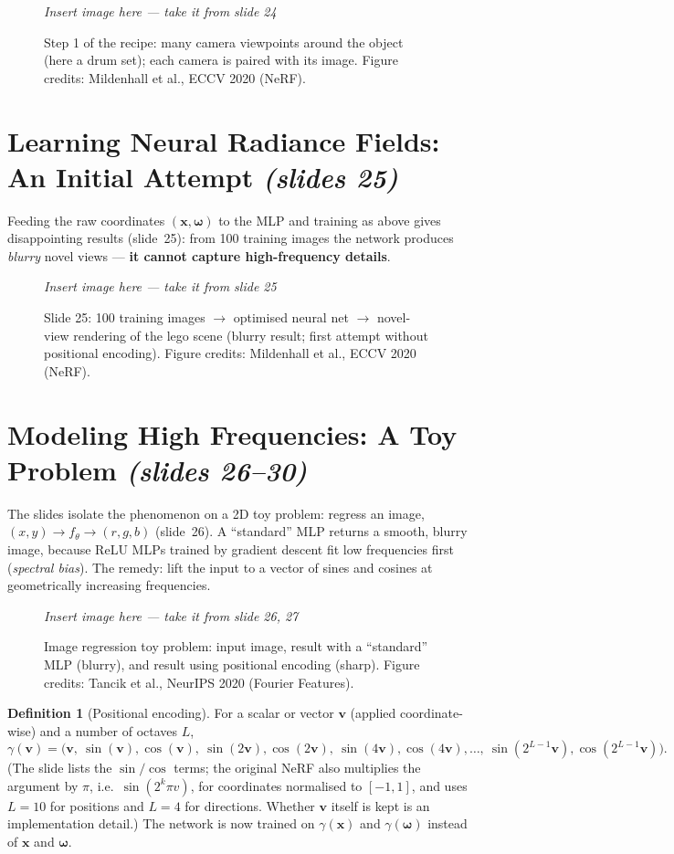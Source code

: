 \documentclass[11pt,a4paper]{article}
\newcommand{\xx}{\boldsymbol{x}}
\newcommand{\om}{\boldsymbol{\omega}}
\newcommand{\sref}[1]{\texorpdfstring{\emph{(slides #1)}}{(slides #1)}}
\theoremstyle{definition}
\newtheorem{definition}{Definition}[section]
\theoremstyle{plain}
\newcommand{\slideimg}[3]{%
\begin{figure}[H]
\centering
\begin{tcolorbox}[enhanced,colback=white,colframe=white,boxrule=0pt,sharp corners,overlay={\draw[dashed,gray,thick] (frame.south west) rectangle (frame.north east);},
  width=0.92\linewidth,height=#2,valign=center,halign=center]
{\color{gray}\itshape Insert image here --- take it from slide #1}
\end{tcolorbox}
\caption{#3}
\end{figure}}
\begin{document}
\slideimg{24}{4.2cm}{Step 1 of the recipe: many camera viewpoints around the object (here a drum set); each camera is paired with its image. Figure credits: Mildenhall et al., ECCV 2020 (NeRF).}

\section{Learning Neural Radiance Fields: An Initial Attempt \sref{25}}

Feeding the raw coordinates $(\xx,\om)$ to the MLP and training as above gives disappointing results (slide~25): from 100 training images the network produces \emph{blurry} novel views --- \textbf{it cannot capture high-frequency details}.

\slideimg{25}{4.8cm}{Slide 25: 100 training images $\to$ optimised neural net $\to$ novel-view rendering of the lego scene (blurry result; first attempt without positional encoding). Figure credits: Mildenhall et al., ECCV 2020 (NeRF).}

\section{Modeling High Frequencies: A Toy Problem \sref{26--30}}

The slides isolate the phenomenon on a 2D toy problem: regress an image, $(x,y)\to f_\theta\to(r,g,b)$ (slide~26). A ``standard'' MLP returns a smooth, blurry image, because ReLU MLPs trained by gradient descent fit low frequencies first (\emph{spectral bias}). The remedy: lift the input to a vector of sines and cosines at geometrically increasing frequencies.

\slideimg{26, 27}{5cm}{Image regression toy problem: input image, result with a ``standard'' MLP (blurry), and result using positional encoding (sharp). Figure credits: Tancik et al., NeurIPS 2020 (Fourier Features).}

\begin{definition}[Positional encoding]\label{def:pe}
For a scalar or vector $\boldsymbol v$ (applied coordinate-wise) and a number of octaves $L$,
\[
\gamma(\boldsymbol v)=\big(\boldsymbol v,\ \sin(\boldsymbol v),\cos(\boldsymbol v),\ \sin(2\boldsymbol v),\cos(2\boldsymbol v),\ \sin(4\boldsymbol v),\cos(4\boldsymbol v),\dots,\ \sin(2^{L-1}\boldsymbol v),\cos(2^{L-1}\boldsymbol v)\big).
\]
(The slide lists the $\sin/\cos$ terms; the original NeRF also multiplies the argument by $\pi$, i.e.\ $\sin(2^k\pi v)$, for coordinates normalised to $[-1,1]$, and uses $L=10$ for positions and $L=4$ for directions. Whether $\boldsymbol v$ itself is kept is an implementation detail.) The network is now trained on $\gamma(\xx)$ and $\gamma(\om)$ instead of $\xx$ and $\om$.
\end{definition}
\end{document}
